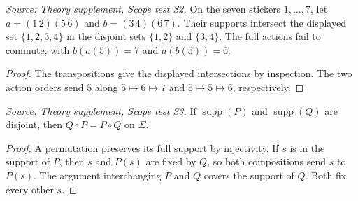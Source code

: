 \begin{lemma}
  \label{lem:scope-visible-disjoint}
  \leanok
  \textit{Source: Theory supplement, Scope test S2.}
  On the seven stickers \(1,\ldots,7\), let \(a=(1\,2)(5\,6)\) and
  \(b=(3\,4)(6\,7)\). Their supports intersect the displayed set
  \(\{1,2,3,4\}\) in the disjoint sets \(\{1,2\}\) and \(\{3,4\}\).
  The full actions fail to commute, with \(b(a(5))=7\) and \(a(b(5))=6\).
\end{lemma}
\begin{proof}
  \leanok
  The transpositions give the displayed intersections by inspection.
  The two action orders send \(5\) along \(5\mapsto6\mapsto7\) and
  \(5\mapsto5\mapsto6\), respectively.
\end{proof}

\begin{lemma}
  \label{lem:disjoint-full-supports}
  \leanok
  \textit{Source: Theory supplement, Scope test S3.}
  If \(\operatorname{supp}(P)\) and \(\operatorname{supp}(Q)\) are
  disjoint, then \(Q\circ P=P\circ Q\) on \(\Sigma\).
\end{lemma}
\begin{proof}
  \leanok
  A permutation preserves its full support by injectivity. If \(s\) is
  in the support of \(P\), then \(s\) and \(P(s)\) are fixed by \(Q\), so
  both compositions send \(s\) to \(P(s)\). The argument interchanging
  \(P\) and \(Q\) covers the support of \(Q\). Both fix every other \(s\).
\end{proof}

